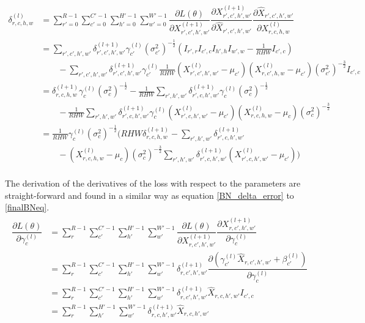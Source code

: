 \documentclass[a4paper,11pt,twoside]{article}
\newcommand*{\pd}[2]{\ensuremath{\dfrac{\partial #1}{\partial #2}}}
\begin{document}
\begin{equation}\label{finalBNeq}
\begin{split}
	\delta^{(l)}_{r,c,h,w} 
	& = \sum^{R-1}_{r'=0} \sum^{C'-1}_{c'=0} \sum^{H'-1}_{h'=0} \sum^{W'-1}_{w'=0} \pd{L(\theta)}{X^{(l+1)}_{r',c',h',w'}} \pd{X^{(l+1)}_{r',c',h',w'}}{\hat{X}_{r',c',h',w'}} \pd{\hat{X}_{r',c',h',w'}}{{X}^{(l)}_{r,c,h,w}}\\
	& = \sum\limits_{r',c',h',w'}\delta^{(l+1)}_{r',c',h',w'} \gamma^{(l)}_{c'} {(\sigma^2_{c'})}^{-\frac{1}{2}} (I_{r',r} I_{c',c} I_{h',h} I_{w',w} - \frac{1}{RHW} I_{c',c}) \\
	& \qquad -\sum\limits_{r',c',h',w'}\delta^{(l+1)}_{r',c',h',w'} \gamma^{(l)}_{c'} \frac{1}{RHW} ({X^{(l)}_{r',c',h',w'} - \mu_{c'}})({X^{(l)}_{r,c',h,w} - \mu_{c'}}) {(\sigma^2_{c'})}^{-\frac{3}{2}} I_{c',c} \\
	& = \delta^{(l+1)}_{r,c,h,w} \gamma^{(l)}_{c} {(\sigma^2_{c})}^{-\frac{1}{2}} - \frac{1}{RHW} \sum\limits_{r',h',w'} \delta^{(l+1)}_{r',c,h',w'} \gamma^{(l)}_{c} {(\sigma^2_{c})}^{-\frac{1}{2}}\\
	& \qquad - \frac{1}{RHW} \sum\limits_{r',h',w'} \delta^{(l+1)}_{r',c,h',w'}\gamma^{(l)}_{c} ({X^{(l)}_{r',c,h',w'} - \mu_{c'}})({X^{(l)}_{r,c,h,w} - \mu_{c}}){(\sigma^2_{c})}^{-\frac{3}{2}} \\
	& = \frac{1}{RHW} \gamma^{(l)}_c {(\sigma^2_{c})}^{-\frac{1}{2}} \biggl(    RHW \delta^{(l+1)}_{r,c,h,w} -  \sum\limits_{r',h',w'} \delta^{(l+1)}_{r',c,h',w'} \qquad \\
	& \qquad -  ({X^{(l)}_{r,c,h,w} - \mu_{c}}) {(\sigma^2_{c})}^{-\frac{3}{2}} \sum\limits_{r',h',w'} \delta^{(l+1)}_{r',c,h',w'} ({X^{(l)}_{r',c,h',w'} - \mu_{c'}}) \biggl) \\
\end{split}
\end{equation}

The derivation of the derivatives of the loss with respect to the parameters are straight-forward and found in a similar way as equation \eqref{BN_delta_error} to \eqref{finalBNeq}. \cite{webBN1} \cite{webBN2}
\begin{align}
\begin{split}
	\pd{L(\theta)}{\gamma^{(l)}_{c}}
		& = \sum^{R-1}_{r} \sum^{C'-1}_{c'} \sum^{H'-1}_{h'} \sum^{W'-1}_{w'} \pd{L(\theta)}{X^{(l+1)}_{r,c',h',w'}} \pd{X^{(l+1)}_{r,c',h',w'}}{\gamma^{(l)}_{c}} \\
		& = \sum^{R-1}_{r} \sum^{C'-1}_{c'} \sum^{H'-1}_{h'} \sum^{W'-1}_{w'} \delta^{(l+1)}_{r,c',h',w'}  \pd{({\gamma_{c'}^{(l)} \hat{X}_{r,c',h',w'} + \beta_{c'}^{(l)}})}{\gamma^{(l)}_{c}} \\
		& = \sum^{R-1}_{r} \sum^{C'-1}_{c'} \sum^{H'-1}_{h'} \sum^{W'-1}_{w'} \delta^{(l+1)}_{r,c',h',w'} \hat{X}_{r,c,h',w'} I_{c',c}\\
		& = \sum^{R-1}_{r} \sum^{H'-1}_{h'} \sum^{W'-1}_{w'} \delta^{(l+1)}_{r,c,h',w'} \hat{X}_{r,c,h',w'} \\
\end{split}
\end{align}
\end{document}
